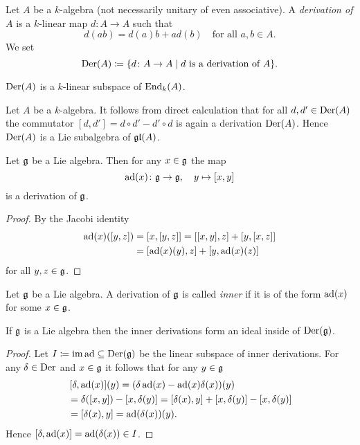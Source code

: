 \begin{defi}
 Let $A$ be a $k$-algebra (not necessarily unitary of even associative). A \emph{derivation of $A$} is a $k$-linear map $d \colon A \to A$ such that
 \[
  d(ab) = d(a)b + ad(b) \quad \text{for all $a,b \in A$}.
 \]
 We set
 \[
  \operatorname{Der}(A) \coloneqq \{d \colon A \to A \mid \text{$d$ is a derivation of $A$} \}.
 \]
\end{defi}


\begin{rem}
 $\operatorname{Der}(A)$ is a $k$-linear subspace of $\operatorname{End}_k(A)$.
\end{rem}


\begin{expl}
  Let $A$ be a $k$-algebra. It follows from direct calculation that for all $d, d' \in \operatorname{Der}(A)$ the commutator $[d,d'] = d \circ d' - d' \circ d$ is again a derivation $\operatorname{Der}(A)$. Hence $\operatorname{Der}(A)$ is a Lie subalgebra of $\mathfrak{gl}(A)$.
\end{expl}


\begin{lem}\label{lem: Lie algebras act adjoint by derivations}
 Let $\mathfrak{g}$ be a Lie algebra. Then for any $x \in \mathfrak{g}$ the map
 \[
  \operatorname{ad}(x) \colon \mathfrak{g} \to \mathfrak{g}, \quad y \mapsto [x,y]
 \]
 is a derivation of $\mathfrak{g}$.
\end{lem}
\begin{proof}
 By the Jacobi identity
 \begin{align*}
  \operatorname{ad}(x)([y,z])
  &= [x,[y,z]]
  = [[x,y],z] + [y,[x,z]] \\
  &= [\operatorname{ad}(x)(y),z] + [y,\operatorname{ad}(x)(z)]
 \end{align*}
 for all $y,z \in \mathfrak{g}$.
\end{proof}


\begin{defi}
 Let $\mathfrak{g}$ be a Lie algebra. A derivation of $\mathfrak{g}$ is called \emph{inner} if it is of the form $\operatorname{ad}(x)$ for some $x \in \mathfrak{g}$.
\end{defi}


\begin{lem}
 If $\mathfrak{g}$ is a Lie algebra then the inner derivations form an ideal inside of $\operatorname{Der}(\mathfrak{g})$.
\end{lem}
\begin{proof}
 Let $I \coloneqq \operatorname{im} \operatorname{ad} \subseteq \operatorname{Der}(\mathfrak{g})$ be the linear subspace of inner derivations. For any $\delta \in \operatorname{Der}$ and $x \in \mathfrak{g}$ it follows that for any $y \in \mathfrak{g}$
 \begin{align*}
  &\,[\delta, \operatorname{ad}(x)](y)
  = (\delta \operatorname{ad}(x) - \operatorname{ad}(x) \delta(x))(y) \\
  &= \delta([x,y]) - [x,\delta(y)]
  = [\delta(x),y] + [x,\delta(y)] - [x,\delta(y)] \\
  &= [\delta(x),y]
  = \operatorname{ad}(\delta(x))(y).
 \end{align*}
 Hence $[\delta, \operatorname{ad}(x)] = \operatorname{ad}(\delta(x)) \in I$.
\end{proof}





